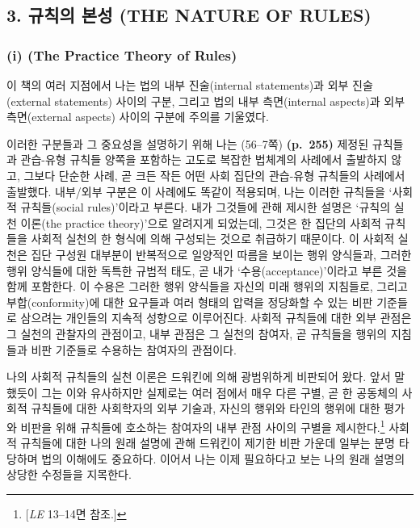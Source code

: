 \subsection{3. 규칙의 본성 (THE NATURE OF
RULES)}\label{uxaddcuxce59uxc758-uxbcf8uxc131-the-nature-of-rules}

\subsubsection{\texorpdfstring{(i)  (The Practice
Theory of
Rules)}{(i) 규칙의 실천 이론 (The Practice Theory of Rules)}}\label{i-uxaddcuxce59uxc758-uxc2e4uxcc9c-uxc774uxb860-the-practice-theory-of-rules}

이 책의 여러 지점에서 나는 법의 내부 진술(internal statements)과 외부
진술(external statements) 사이의 구분, 그리고 법의 내부 측면(internal
aspects)과 외부 측면(external aspects) 사이의 구분에 주의를 기울였다.

이러한 구분들과 그 중요성을 설명하기 위해 나는 (56--7쪽)
\textbf{(p.~255)} 제정된 규칙들과 관습-유형 규칙들 양쪽을 포함하는
고도로 복잡한 법체계의 사례에서 출발하지 않고, 그보다 단순한 사례, 곧
크든 작든 어떤 사회 집단의 관습-유형 규칙들의 사례에서 출발했다.
내부/외부 구분은 이 사례에도 똑같이 적용되며, 나는 이러한 규칙들을
‘사회적 규칙들(social rules)’이라고 부른다. 내가 그것들에 관해 제시한
설명은 ‘규칙의 실천 이론(the practice theory)’으로 알려지게 되었는데,
그것은 한 집단의 사회적 규칙들을 사회적 실천의 한 형식에 의해 구성되는
것으로 취급하기 때문이다. 이 사회적 실천은 집단 구성원 대부분이
반복적으로 일양적인 따름을 보이는 행위 양식들과, 그러한 행위 양식들에
대한 독특한 규범적 태도, 곧 내가 ‘수용(acceptance)’이라고 부른 것을 함께
포함한다. 이 수용은 그러한 행위 양식들을 자신의 미래 행위의 지침들로,
그리고 부합(conformity)에 대한 요구들과 여러 형태의 압력을 정당화할 수
있는 비판 기준들로 삼으려는 개인들의 지속적 성향으로 이루어진다. 사회적
규칙들에 대한 외부 관점은 그 실천의 관찰자의 관점이고, 내부 관점은 그
실천의 참여자, 곧 규칙들을 행위의 지침들과 비판 기준들로 수용하는
참여자의 관점이다.

나의 사회적 규칙들의 실천 이론은 드워킨에 의해 광범위하게 비판되어 왔다.
앞서 말했듯이 그는 이와 유사하지만 실제로는 여러 점에서 매우 다른 구별,
곧 한 공동체의 사회적 규칙들에 대한 사회학자의 외부 기술과, 자신의
행위와 타인의 행위에 대한 평가와 비판을 위해 규칙들에 호소하는 참여자의
내부 관점 사이의 구별을 제시한다.\footnote{{[}\emph{LE} 13--14면
  참조.{]}} 사회적 규칙들에 대한 나의 원래 설명에 관해 드워킨이 제기한
비판 가운데 일부는 분명 타당하며 법의 이해에도 중요하다. 이어서 나는
이제 필요하다고 보는 나의 원래 설명의 상당한 수정들을 지목한다.

